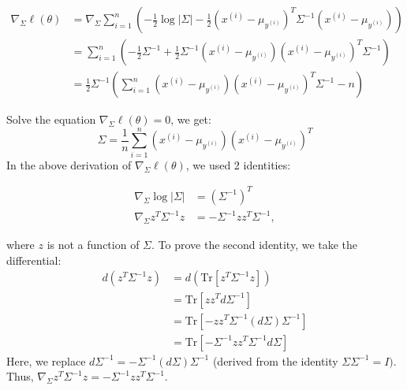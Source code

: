 \begin{answer}
\begin{align}
	\nabla_{\Sigma}\ell(\theta) 
	&= \nabla_{\Sigma} \sum \limits_{i = 1}^{n} \left(- \frac{1}{2}\log |\Sigma| - \frac{1}{2}(x^{(i)} - \mu_{y^{(i)}})^T \Sigma^{-1} (x^{(i)} - \mu_{y^{(i)}}) \right) \\
	&= \sum \limits_{i = 1}^{n} \left( -\frac{1}{2} \Sigma^{-1} + \frac{1}{2}  \Sigma^{-1} (x^{(i)} - \mu_{y^{(i)}}) (x^{(i)} - \mu_{y^{(i)}})^T \Sigma^{-1} \right) \\
	&= \frac{1}{2} \Sigma^{-1}\left( \sum \limits_{i = 1}^{n} (x^{(i)} - \mu_{y^{(i)}}) (x^{(i)} - \mu_{y^{(i)}})^T \Sigma^{-1} - n \right)
\end{align}

Solve the equation $\nabla_{\Sigma} \ell(\theta) = 0$, we get:
$$\widehat\Sigma = \frac{1}{n} \sum \limits_{i = 1}^{n} (x^{(i)} - \mu_{y^{(i)}}) (x^{(i)} - \mu_{y^{(i)}})^T$$
In the above derivation of $\nabla_{\Sigma} \ell(\theta)$, we used 2 identities:

\begin{align}
\nabla_{\Sigma}\log|\Sigma| &= (\Sigma^{-1})^T \\
\nabla_{\Sigma} z^T\Sigma^{-1} z &= -\Sigma^{-1} z z^T \Sigma^{-1}, 
\end{align}

where $z$ is not a function of $\Sigma$. To prove the second identity, we take the differential:
\begin{align}
	d(z^T \Sigma^{-1} z) 
	&= d(\text{Tr}[z^T \Sigma^{-1} z]) \\
	&= \text{Tr}[z z^T d\Sigma^{-1}] \\
	&= \text{Tr}[-z z^T \Sigma^{-1} (d\Sigma) \Sigma^{-1}] \\
	&= \text{Tr}[-\Sigma^{-1} z z^T \Sigma^{-1} d\Sigma]
\end{align}
Here, we replace $ d\Sigma^{-1} = -\Sigma^{-1}(d\Sigma)\Sigma^{-1} $ (derived from the identity $\Sigma \Sigma^{-1} = I)$. Thus, $\nabla_{\Sigma} z^T\Sigma^{-1} z = -\Sigma^{-1} z z^T \Sigma^{-1}$. \\
\end{answer}
